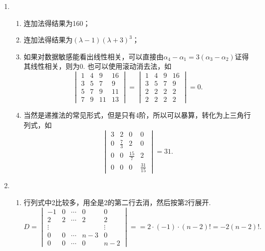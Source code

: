 \begin{enumerate}
    \item \begin{enumerate}
        \item 连加法得结果为160；
        \item 连加法得结果为$(\lambda-1)(\lambda+3)^3$；
        \item 如果对数据敏感能看出线性相关，可以直接由$\alpha_4-\alpha_1=3(\alpha_3-\alpha_2)$证得其线性相关，则为0. 也可以使用滚动消去法，如\[
        \begin{vmatrix}
        1&4&9&16\\
        3&5&7&9\\
        5&7&9&11\\
        7&9&11&13
        \end{vmatrix}=\begin{vmatrix}
        1&4&9&16\\
        3&5&7&9\\
        2&2&2&2\\
        2&2&2&2
        \end{vmatrix}=0.\]
        \item 当然是递推法的常见形式，但是只有4阶，所以可以暴算，转化为上三角行列式，如\[
        \begin{vmatrix}
        3&2&0&0\\
        0&\frac{7}{3}&2&0\\
        0&0&\frac{15}{7}&2\\
        0&0&0&\frac{31}{15}
        \end{vmatrix}=31.\]
    \end{enumerate}

    \item \begin{enumerate}
        \item 行列式中2比较多，用全是2的第二行去消，然后按第2行展开.\[D=\begin{vmatrix}
        -1 & 0 & \cdots & 0 & 0 \\
        2 & 2 & \cdots & 2 & 2 \\
        \vdots & & & & \vdots \\
        0 & 0 & \cdots & n-3 & 0 \\
        0 & 0 & \cdots & 0 & n-2
        \end{vmatrix}=
        =2\cdot(-1)\cdot(n-2)!=-2(n-2)!.\]


\end{enumerate}
\end{enumerate}
